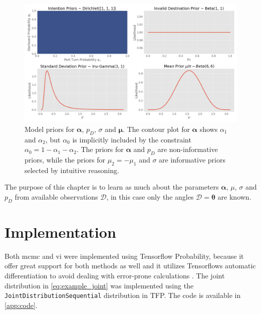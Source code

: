\begin{figure}
    \centering
    \includegraphics[width=1\textwidth]{figures/priors.png}
    \caption{Model priors for $\boldsymbol{\alpha}$, $p_D$, $\sigma$ and $\boldsymbol{\mu}$. The contour plot for $\boldsymbol{\alpha}$ shows $\alpha_1$ and $\alpha_2$, but $\alpha_0$ is implicitly included by the constraint $\alpha_0 = 1 - \alpha_1 - \alpha_2$. The priors for $\boldsymbol{\alpha}$ and $p_D$ are non-informative priors, while the priors for $\mu_2 = -\mu_1$ and $\sigma$ are informative priors selected by intuitive reasoning.}
    \label{fig:priors}
\end{figure}

The purpose of this chapter is to learn as much about the parameters $\boldsymbol{\alpha}$, $\mu$, $\sigma$ and $p_D$ from available observations $\mathcal{D}$, in this case only the angles $\mathcal{D} = \boldsymbol{\theta}$ are known. 

\section{Implementation}
Both \acrshort{mcmc} and \acrshort{vi} were implemented using Tensorflow Probability, because it offer great support for both methods as well and it utilizes Tensorflows automatic differentiation to avoid dealing with error-prone calculations \cite{tensorflow2015-whitepaper}. The joint distribution in \cref{eq:example_joint} was implemented using the \texttt{JointDistributionSequential} distribution in TFP. The code is available in \cref{app:code}.


